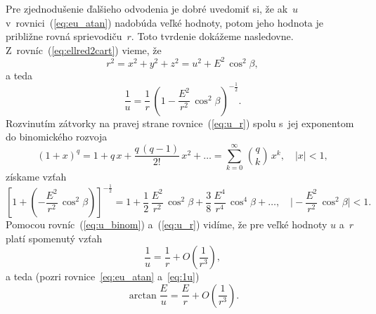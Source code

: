 \documentclass[a4paper, 12pt]{book}
\begin{document}
Pre zjednodušenie ďalšieho odvodenia je dobré uvedomiť si, že ak~$u$ 
v~rovnici~(\ref{eq:eu_atan}) nadobúda veľké hodnoty, potom jeho hodnota je 
približne rovná sprievodiču~$r$.  Toto tvrdenie dokážeme nasledovne.  
Z~rovníc~(\ref{eq:ellred2cart}) vieme, že
%
\begin{equation}
r^2 = x^2 + y^2 + z^2 = u^2 + E^2 \, \cos^2\beta{,}
\end{equation}
%
a teda
%
\begin{equation}
\label{eq:u_r}
\frac{1}{u} = \frac{1}{r} \, \left( 1 - \frac{E^2}{r^2} \, \cos^2\beta 
\right)^{-\frac{1}{2}}{.}
\end{equation}
%
Rozvinutím zátvorky na pravej strane rovnice~(\ref{eq:u_r}) spolu s~jej 
exponentom do binomického rozvoja \parencite[pozri napríklad][]{Gradshteyn2007}
%
\begin{equation}
(1 + x)^q = 1 + q \, x + \frac{q \, (q - 1)}{2!} \, x^2 + \dots = \sum_{k 
= 0}^{\infty} \, \binom{q}{k} \, x^k{,} \quad | x | < 1{,}
\end{equation}
%
získame vzťah
%
\begin{equation}
\label{eq:u_binom}
\left[ 1 + \left( - \frac{E^2}{r^2} \, \cos^2\beta \right) 
\right]^{-\frac{1}{2}} = 1 + \frac{1}{2} \, \frac{E^2}{r^2} \, \cos^2\beta 
+ \frac{3}{8} \, \frac{E^4}{r^4} \, \cos^4\beta + \dots{,} \quad \bigg\lvert 
-\frac{E^2}{r^2} \, \cos^2\beta \bigg\rvert < 1{.}
\end{equation}
%
Pomocou rovníc~(\ref{eq:u_binom}) a~(\ref{eq:u_r}) vidíme, že pre veľké hodnoty 
$u$ a~$r$ platí spomenutý vzťah
%
\begin{equation}
\label{eq:1u}
\frac{1}{u} = \frac{1}{r} + O\left( \frac{1}{r^3} \right){,}
\end{equation}
%
a teda (pozri rovnice~\ref{eq:eu_atan} a~\ref{eq:1u})
%
\begin{equation}
\label{eq:arctan_eu_r}
\arctan\frac{E}{u} = \frac{E}{r} + O\left( \frac{1}{r^3} \right){.}
\end{equation}
\end{document}
